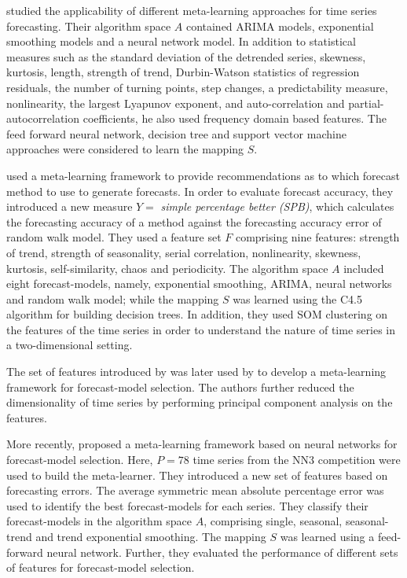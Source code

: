 \documentclass[11pt,a4paper,]{article}
\theoremstyle{definition}
\theoremstyle{definition}
\theoremstyle{definition}
\theoremstyle{remark}
\begin{document}
\textcite{lemke2010meta} studied the applicability of different
meta-learning approaches for time series forecasting. Their algorithm
space \(A\) contained ARIMA models, exponential smoothing models and a
neural network model. In addition to statistical measures such as the
standard deviation of the detrended series, skewness, kurtosis, length,
strength of trend, Durbin-Watson statistics of regression residuals, the
number of turning points, step changes, a predictability measure,
nonlinearity, the largest Lyapunov exponent, and auto-correlation and
partial-autocorrelation coefficients, he also used frequency domain
based features. The feed forward neural network, decision tree and
support vector machine approaches were considered to learn the mapping
\(S\).

\textcite{wang2009rule} used a meta-learning framework to provide
recommendations as to which forecast method to use to generate
forecasts. In order to evaluate forecast accuracy, they introduced a new
measure \(Y =\) \emph{simple percentage better (SPB)}, which calculates
the forecasting accuracy of a method against the forecasting accuracy
error of random walk model. They used a feature set \(F\) comprising
nine features: strength of trend, strength of seasonality, serial
correlation, nonlinearity, skewness, kurtosis, self-similarity, chaos
and periodicity. The algorithm space \(A\) included eight
forecast-models, namely, exponential smoothing, ARIMA, neural networks
and random walk model; while the mapping \(S\) was learned using the
C4.5 algorithm for building decision trees. In addition, they used SOM
clustering on the features of the time series in order to understand the
nature of time series in a two-dimensional setting.

The set of features introduced by \textcite{wang2009rule} was later used
by \textcite{widodomodel} to develop a meta-learning framework for
forecast-model selection. The authors further reduced the dimensionality
of time series by performing principal component analysis on the
features.

More recently, \textcite{kuck2016meta} proposed a meta-learning
framework based on neural networks for forecast-model selection. Here,
\(P = 78\) time series from the NN3 competition were used to build the
meta-learner. They introduced a new set of features based on forecasting
errors. The average symmetric mean absolute percentage error was used to
identify the best forecast-models for each series. They classify their
forecast-models in the algorithm space \(A\), comprising single,
seasonal, seasonal-trend and trend exponential smoothing. The mapping
\(S\) was learned using a feed-forward neural network. Further, they
evaluated the performance of different sets of features for
forecast-model selection.
\end{document}
